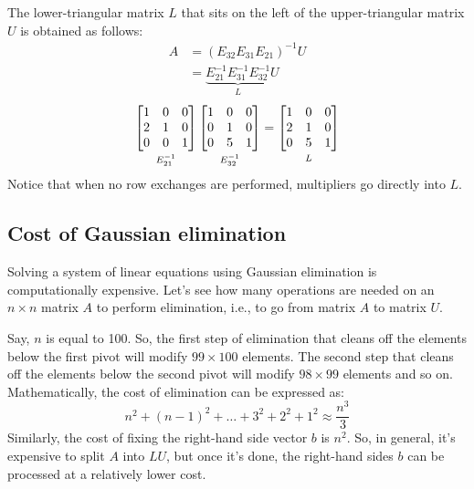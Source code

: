 \documentclass[../main.tex]{subfiles}
\begin{document}
The lower-triangular matrix \(L\) that sits on the left of the upper-triangular matrix \(U\) is obtained as follows:
\[
    \begin{aligned}
        A & = (E_{32}E_{31}E_{21})^{-1}U                          \\
          & = \underbrace{E_{21}^{-1}E_{31}^{-1}E_{32}^{-1}}_{L}U
    \end{aligned}
\]
\[
    \underbracket[0pt][0pt]{
        \begin{bmatrix*}[r]
            1 & 0 & 0 \\
            2 & 1 & 0 \\
            0 & 0 & 1
        \end{bmatrix*}
    }_{\mathstrut E_{21}^{-1}}
    \underbracket[0pt][0pt]{
        \begin{bmatrix*}[r]
            1 & 0 & 0 \\
            0 & 1 & 0 \\
            0 & 5 & 1
        \end{bmatrix*}
    }_{\mathstrut E_{32}^{-1}}
    =
    \underbracket[0pt][0pt]{
        \begin{bmatrix*}
            1 & 0 & 0 \\
            2 & 1 & 0 \\
            0 & 5 & 1
        \end{bmatrix*}
    }_{\mathstrut L}
\]
Notice that when no row exchanges are performed, multipliers go directly into \(L\).


\subsection{Cost of Gaussian elimination}
Solving a system of linear equations using Gaussian elimination is computationally expensive. Let's see how many operations are needed on an \(n \times n\) matrix \(A\) to perform elimination, i.e., to go from matrix \(A\) to matrix \(U\).
\vspace{0.5em}

Say, \(n\) is equal to 100. So, the first step of elimination that cleans off the elements below the first pivot will modify \(99 \times 100\) elements. The second step that cleans off the elements below the second pivot will modify \(98 \times 99\) elements and so on. Mathematically, the cost of elimination can be expressed as:
\[
    n^2 + (n - 1)^2 + \dots + 3^2 + 2^2 + 1^2 \approx \frac{n^3}{3}
\]
Similarly, the cost of fixing the right-hand side vector \(b\) is \(n^2\). So, in general, it's expensive to split \(A\) into \(LU\), but once it's done, the right-hand sides \(b\) can be processed at a relatively lower cost.
\end{document}
